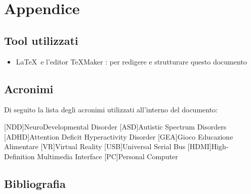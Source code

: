 \section{Appendice} \label{sec:app}

\subsection{Tool utilizzati} \label{subsec:tool}

\begin{itemize}
	\item \LaTeX\ e l'editor TeXMaker : per redigere e strutturare questo documento
\end{itemize}

\subsection{Acronimi} \label{acr}
Di seguito la lista degli acronimi utilizzati all'interno del documento:

\begin{acronym}[NDD] %

[NDD]{NeuroDevelopmental Disorder}
[ASD]{Autistic Spectrum Disorders}
[ADHD]{Attention Deficit Hyperactivity Disorder}
[GEA]{Gioco Educazione Alimentare}
[VR]{Virtual Reality}
[USB]{Universal Serial Bus}
[HDMI]{High-Definition Multimedia Interface}
[PC]{Personal Computer}



\end{acronym}

\subsection{Bibliografia} \label{subsec:biblio}